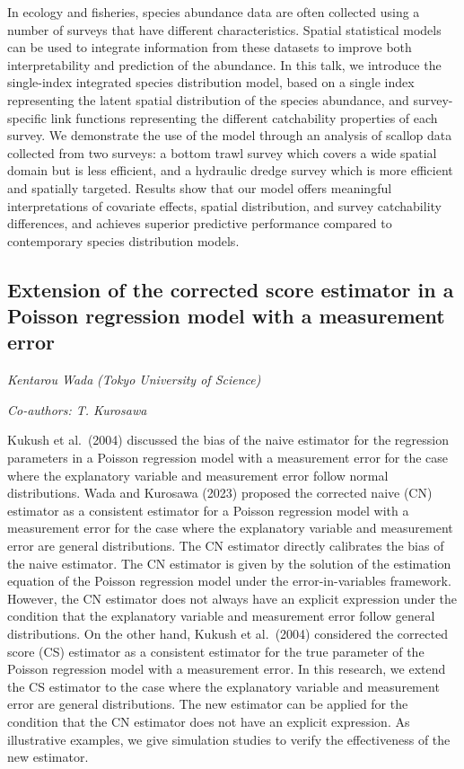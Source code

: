 \documentclass[
]{scrreprt}
\begin{document}
In ecology and fisheries, species abundance data are often collected
using a number of surveys that have different characteristics. Spatial
statistical models can be used to integrate information from these
datasets to improve both interpretability and prediction of the
abundance. In this talk, we introduce the single-index integrated
species distribution model, based on a single index representing the
latent spatial distribution of the species abundance, and
survey-specific link functions representing the different catchability
properties of each survey. We demonstrate the use of the model through
an analysis of scallop data collected from two surveys: a bottom trawl
survey which covers a wide spatial domain but is less efficient, and a
hydraulic dredge survey which is more efficient and spatially targeted.
Results show that our model offers meaningful interpretations of
covariate effects, spatial distribution, and survey catchability
differences, and achieves superior predictive performance compared to
contemporary species distribution models.

\subsection{Extension of the corrected score estimator in a Poisson
regression model with a measurement
error}\label{extension-of-the-corrected-score-estimator-in-a-poisson-regression-model-with-a-measurement-error}

\emph{Kentarou Wada} \emph{(Tokyo University of
Science)}

\emph{Co-authors: T. Kurosawa}

\setlength{\parskip}{0.5em}

Kukush et al.~(2004) discussed the bias of the naive estimator for the
regression parameters in a Poisson regression model with a measurement
error for the case where the explanatory variable and measurement error
follow normal distributions. Wada and Kurosawa (2023) proposed the
corrected naive (CN) estimator as a consistent estimator for a Poisson
regression model with a measurement error for the case where the
explanatory variable and measurement error are general distributions.
The CN estimator directly calibrates the bias of the naive estimator.
The CN estimator is given by the solution of the estimation equation of
the Poisson regression model under the error-in-variables framework.
However, the CN estimator does not always have an explicit expression
under the condition that the explanatory variable and measurement error
follow general distributions. On the other hand, Kukush et al.~(2004)
considered the corrected score (CS) estimator as a consistent estimator
for the true parameter of the Poisson regression model with a
measurement error. In this research, we extend the CS estimator to the
case where the explanatory variable and measurement error are general
distributions. The new estimator can be applied for the condition that
the CN estimator does not have an explicit expression. As illustrative
examples, we give simulation studies to verify the effectiveness of the
new estimator.
\end{document}
